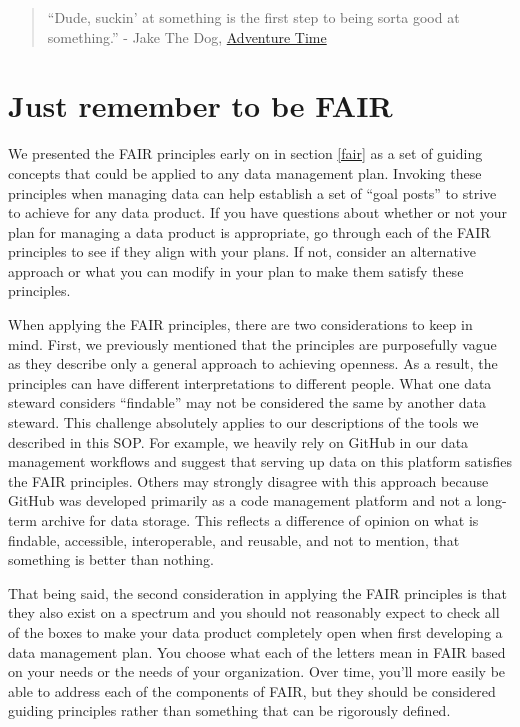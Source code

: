\documentclass[
]{book}
\begin{document}
\begin{quote}
``Dude, suckin' at something is the first step to being sorta good at something.'' - Jake The Dog, \href{https://en.wikipedia.org/wiki/Adventure_Time}{Adventure Time}
\end{quote}

\hypertarget{just-remember-to-be-fair}{%
\section{Just remember to be FAIR}\label{just-remember-to-be-fair}}

We presented the FAIR principles early on in section \ref{fair} as a set of guiding concepts that could be applied to any data management plan. Invoking these principles when managing data can help establish a set of ``goal posts'' to strive to achieve for any data product. If you have questions about whether or not your plan for managing a data product is appropriate, go through each of the FAIR principles to see if they align with your plans. If not, consider an alternative approach or what you can modify in your plan to make them satisfy these principles.

When applying the FAIR principles, there are two considerations to keep in mind. First, we previously mentioned that the principles are purposefully vague as they describe only a general approach to achieving openness. As a result, the principles can have different interpretations to different people. What one data steward considers ``findable'' may not be considered the same by another data steward. This challenge absolutely applies to our descriptions of the tools we described in this SOP. For example, we heavily rely on GitHub in our data management workflows and suggest that serving up data on this platform satisfies the FAIR principles. Others may strongly disagree with this approach because GitHub was developed primarily as a code management platform and not a long-term archive for data storage. This reflects a difference of opinion on what is findable, accessible, interoperable, and reusable, and not to mention, that something is better than nothing.

That being said, the second consideration in applying the FAIR principles is that they also exist on a spectrum and you should not reasonably expect to check all of the boxes to make your data product completely open when first developing a data management plan. You choose what each of the letters mean in FAIR based on your needs or the needs of your organization. Over time, you'll more easily be able to address each of the components of FAIR, but they should be considered guiding principles rather than something that can be rigorously defined.
\end{document}
